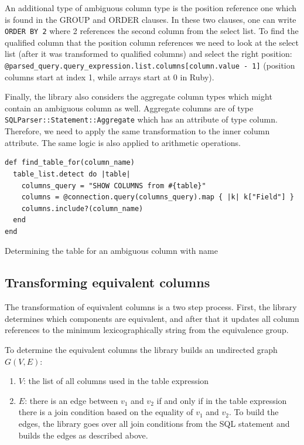 An additional type of ambiguous column type is the position reference one which is found in the GROUP and ORDER clauses. In these two clauses, one can write \texttt{ORDER BY 2} where 2 references the second column from the select list. To find the qualified column that the position column references we need to look at the select list (after it was transformed to qualified columns) and select the right position: \texttt{@parsed_query.query_expression.list.columns[column.value - 1]} (position columns start at index 1, while arrays start at 0 in Ruby).

Finally, the library also considers the aggregate column types which might contain an ambiguous column as well. Aggregate columns are of type \texttt{SQLParser::Statement::Aggregate} which has an attribute of type column. Therefore, we need to apply the same transformation to the inner column attribute. The same logic is also applied to arithmetic operations.

\begin{code}
\begin{verbatim}
def find_table_for(column_name)
  table_list.detect do |table|
    columns_query = "SHOW COLUMNS from #{table}"
    columns = @connection.query(columns_query).map { |k| k["Field"] }
    columns.include?(column_name)
  end
end
\end{verbatim}
\caption{Determining the table for an ambiguous column with name}
\label{fig:find_table}
\end{code}


\subsection{Transforming equivalent columns}

The transformation of equivalent columns is a two step process. First, the library determines which components are equivalent, and after that it updates all column references to the minimum lexicographically string from the equivalence group.

To determine the equivalent columns the library builds an undirected graph $G(V, E)$:
\begin{enumerate}
    \item $V$: the list of all columns used in the table expression
    \item $E$: there is an edge between $v_1$ and $v_2$ if and only if in the table expression there is a join condition based on the equality of $v_1$ and $v_2$. To build the edges, the library goes over all join conditions from the SQL statement and builds the edges as described above.
\end{enumerate}

